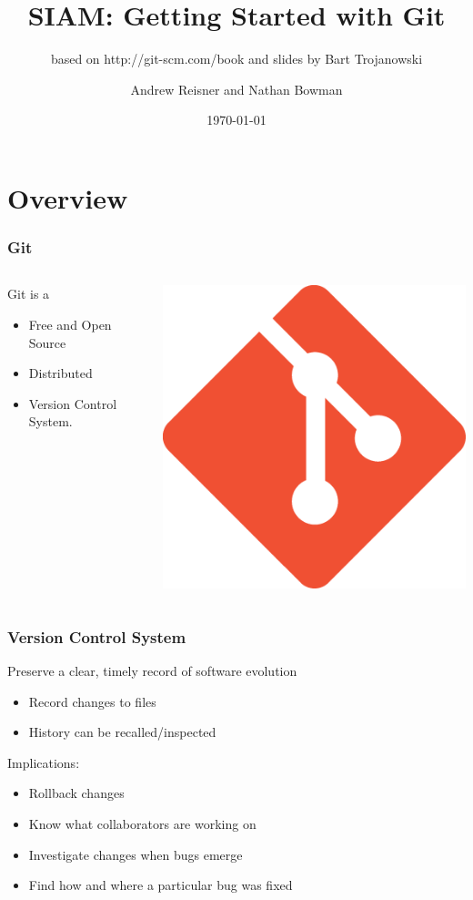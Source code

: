 \documentclass[english,compress]{beamer}
\title{SIAM: Getting Started with Git}
\subtitle{based on http://git-scm.com/book and slides by Bart Trojanowski}
\author{Andrew Reisner and Nathan Bowman}
\date{\today}
\begin{document}
\frame{\titlepage}

\section{Overview}
\frame
{
    \frametitle{Git}
    \begin{columns}
    \begin{column}{.5\textwidth}
        Git is a
        \begin{itemize}
            \item Free and Open Source
            \item Distributed
            \item Version Control System.
        \end{itemize}
    \end{column}
    \begin{column}{.5\textwidth}
        \begin{center}
            \includegraphics[width=.7\textwidth]{figs/git-logo.png} 
        \end{center}
    \end{column}
    \end{columns}
}

\frame
{
    \frametitle{Version Control System}

        Preserve a clear, timely record of software evolution
            \begin{itemize}
                \item Record changes to files
                \item History can be recalled/inspected
            \end{itemize}
        Implications:
            \begin{itemize}
                \item Rollback changes
                \item Know what collaborators are working on
                \item Investigate changes when bugs emerge
                \item Find how and where a particular bug was fixed
            \end{itemize}
}
\end{document}
